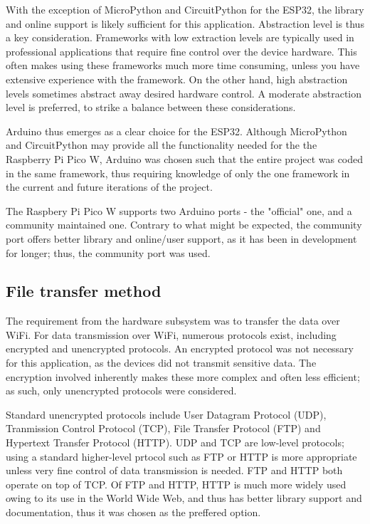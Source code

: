 \documentclass[class=report,11pt,crop=false]{standalone}
\begin{document}
With the exception of MicroPython and CircuitPython for the ESP32, the library and online support is likely sufficient for this application. Abstraction level is thus a key consideration. Frameworks with low extraction levels are typically used in professional applications that require fine control over the device hardware. This often makes using these frameworks much more time consuming, unless you have extensive experience with the framework. On the other hand, high abstraction levels sometimes abstract away desired hardware control. A moderate abstraction level is preferred, to strike a balance between these considerations.

Arduino thus emerges as a clear choice for the ESP32. Although MicroPython and CircuitPython may provide all the functionality needed for the the Raspberry Pi Pico W, Arduino was chosen such that the entire project was coded in the same framework, thus requiring knowledge of only the one framework in the current and future iterations of the project.

The Raspbery Pi Pico W supports two Arduino ports - the "official" one, and a community maintained one. Contrary to what might be expected, the community port offers better library and online/user support, as it has been in development for longer; thus, the community port was used.

\subsection{File transfer method}

The requirement from the hardware subsystem was to transfer the data over WiFi. For data transmission over WiFi, numerous protocols exist, including encrypted and unencrypted protocols. An encrypted protocol was not necessary for this application, as the devices did not transmit sensitive data. The encryption involved inherently makes these more complex and often less efficient; as such, only unencrypted protocols were considered.

Standard unencrypted protocols include User Datagram Protocol (UDP), Tranmission Control Protocol (TCP), File Transfer Protocol (FTP) and Hypertext Transfer Protocol (HTTP). UDP and TCP are low-level protocols; using a standard higher-level prtocol such as FTP or HTTP is more appropriate unless very fine control of data transmission is needed. FTP and HTTP both operate on top of TCP. Of FTP and HTTP, HTTP is much more widely used owing to its use in the World Wide Web, and thus has better library support and documentation, thus it was chosen as the preffered option.
\end{document}
